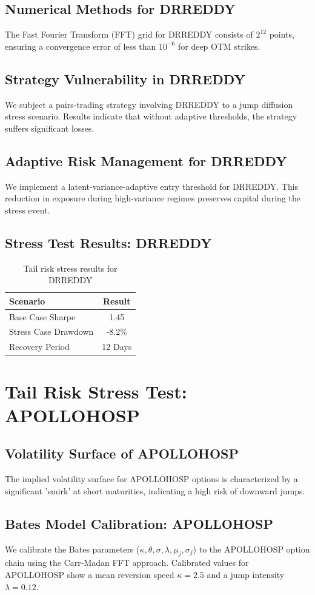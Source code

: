 \documentclass[12pt,a4paper,twoside]{article}
\begin{document}
\subsection{Numerical Methods for DRREDDY}
The Fast Fourier Transform (FFT) grid for DRREDDY consists of $2^{12}$ points, ensuring a convergence error of less than $10^{-6}$ for deep OTM strikes.
\subsection{Strategy Vulnerability in DRREDDY}
We subject a pairs-trading strategy involving DRREDDY to a jump diffusion stress scenario. Results indicate that without adaptive thresholds, the strategy suffers significant losses.
\subsection{Adaptive Risk Management for DRREDDY}
We implement a latent-variance-adaptive entry threshold for DRREDDY. This reduction in exposure during high-variance regimes preserves capital during the stress event.
\subsection{Stress Test Results: DRREDDY}
\begin{table}[H]
\centering
\begin{tabular}{|l|c|}
\hline
Scenario & Result \\
\hline
Base Case Sharpe & 1.45 \\
Stress Case Drawdown & -8.2\% \\
Recovery Period & 12 Days \\
\hline
\end{tabular}
\caption{Tail risk stress results for DRREDDY}
\end{table}
\newpage

\section{Tail Risk Stress Test: APOLLOHOSP}
\subsection{Volatility Surface of APOLLOHOSP}
The implied volatility surface for APOLLOHOSP options is characterized by a significant 'smirk' at short maturities, indicating a high risk of downward jumps.
\subsection{Bates Model Calibration: APOLLOHOSP}
We calibrate the Bates parameters ($\kappa, \theta, \sigma, \lambda, \mu_j, \sigma_j$) to the APOLLOHOSP option chain using the Carr-Madan FFT approach.
Calibrated values for APOLLOHOSP show a mean reversion speed $\kappa = 2.5$ and a jump intensity $\lambda = 0.12$.
\end{document}
